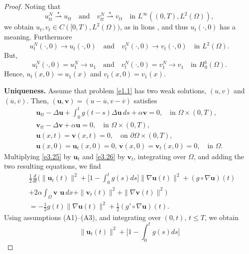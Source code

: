 \begin{proof}
Noting that
\[
 u_{tt}^{N} \overset{\star}{\rightharpoonup} u_{tt} \quad \text{and} \quad
 v_{tt}^{N} \overset{\star}{\rightharpoonup} v_{tt} \quad \text{in }
 L^\infty((0,T), L^2(\Omega)),
\]
we obtain $ u_t , v_{t} \in C([0, T), L^2(\Omega))$, as in lions \cite{Lions},
and thus \( u_t(\cdot, 0) \) has a meaning. Furthermore
\[
u^N_t(\cdot, 0) \to u_t(\cdot, 0) \quad \text{and} \quad
v^N_t(\cdot, 0) \to v_t(\cdot, 0) \quad\text{in } L^2(\Omega).
\]
But,
\[ u^N_t(\cdot, 0) = u^N_1 \to u_1 \quad \text{and} \quad
 v^N_t(\cdot, 0) = v^N_1 \to v_1 \quad \text{in } H^1_0(\Omega).
\]
Hence,
$u_t(x, 0) = u_1(x)$ and $v_t(x, 0) = v_1(x)$.
\smallskip

\noindent\textbf{Uniqueness.}
Assume that problem \eqref{e1.1} has two weak solutions, \( (u, v) \) and
\( (\overline{u},\overline{v}) \). Then,
\( (\mathbf{u}, \mathbf{v}) = (u - \overline{u}, v - \overline{v}) \) satisfies
\begin{gather}
 \mathbf{u}_{tt} - \Delta \mathbf{u} + \int_0^t g(t-s) \Delta \mathbf{u} \, ds
 + \alpha \mathbf{v} = 0, \quad \text{in } \Omega \times (0, T), \label{e3.25}\\
 \mathbf{v}_{tt} - \Delta \mathbf{v} + \alpha \mathbf{u} = 0, \quad
 \text{in } \Omega \times (0, T), \label{e3.26} \\
 \mathbf{u}(x,t) = \mathbf{v}(x,t) = 0, \quad \text{on } \partial\Omega \times (0, T),
 \label{e3.27}\\
 \mathbf{u}(x,0) = \mathbf{u}_t(x,0) =0,\, \mathbf{v}(x,0)=\mathbf{v}_t(x,0) = 0,
 \quad \text{in } \Omega. \label{e3.28}
\end{gather}
Multiplying \eqref{e3.25} by $\mathbf{u}_{t}$ and \eqref{e3.26} by $\mathbf{v}_{t}$,
integrating over $\Omega$, and adding the two resulting equations, we find
\begin{equation}
\begin{aligned}
&\frac{1}{2}\frac{d}{dt} \Big( \| \mathbf{u}_{t}(t) \| ^2
 + \Big[ 1-\int_0^t g(s) ds \Big] \| \nabla \mathbf{u} (t)\|^2
 +(g\circ \nabla \mathbf{u})(t) \\
&+2 \alpha \int_\Omega \mathbf{v}\textbf{ u}\,dx
 +\| \mathbf{v}_{t}(t) \|^2 + \| \nabla \mathbf{v} (t)\|^2 \Big)\\
& = -\frac{1}{2} g(t)\parallel \nabla \mathbf{u}(t) \parallel^2
 + \frac{1}{2}( g'\circ\nabla \mathbf{u}) (t).
\end{aligned} \label{e3.29}
\end{equation}
Using assumptions (A1)--(A3), and integrating over $(0, t),\, t\leq T$, we obtain
\[
 \| \mathbf{u}_{t}(t) \| ^2+ \Big[ 1-\int_0^t g(s) ds \Big]
\]
\end{proof}
